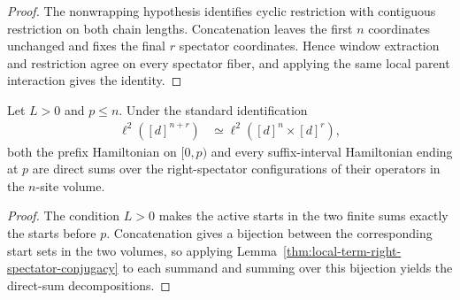 \begin{proof}
    \leanok
    The nonwrapping hypothesis identifies cyclic restriction with contiguous
    restriction on both chain lengths.  Concatenation leaves the first $n$
    coordinates unchanged and fixes the final $r$ spectator coordinates.
    Hence window extraction and restriction agree on every spectator fiber,
    and applying the same local parent interaction gives the identity.
\end{proof}

\begin{lemma}
    \label{thm:open-hamiltonian-right-spectator-conjugacy}
    \leanok
    Let $L>0$ and $p\leq n$.  Under the standard identification
    \begin{align}
        \ell^2([d]^{n+r}) & \simeq
        \ell^2([d]^n\times[d]^r),
    \end{align}
    both the prefix Hamiltonian on $[0,p)$ and every suffix-interval
    Hamiltonian ending at $p$ are direct sums over the right-spectator
    configurations of their operators in the $n$-site volume.
\end{lemma}

\begin{proof}
    \leanok
    The condition $L>0$ makes the active starts in the two finite sums exactly
    the starts before $p$.  Concatenation gives a bijection between the
    corresponding start sets in the two volumes, so applying
    Lemma~\ref{thm:local-term-right-spectator-conjugacy} to each summand and
    summing over this bijection yields the direct-sum decompositions.
\end{proof}

